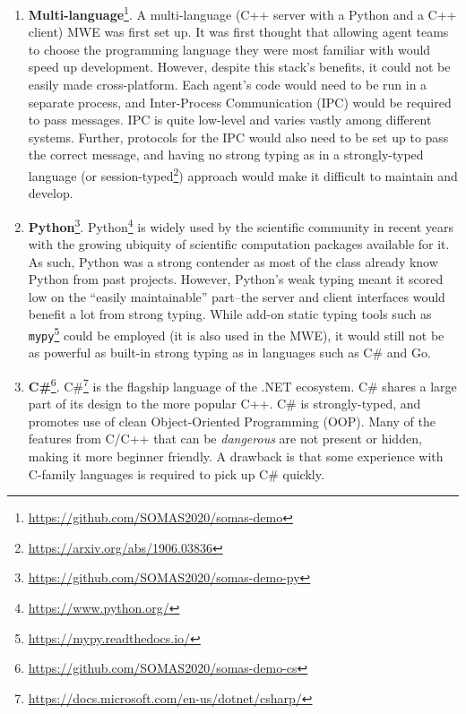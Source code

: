 \begin{enumerate}
    \item \textbf{Multi-language}\footnote{\url{https://github.com/SOMAS2020/somas-demo}}.
          A multi-language (C++ server with a Python and a C++ client) MWE was first set up. It was first thought that allowing agent teams to choose the programming language they were most familiar with would speed up development. However, despite this stack's benefits, it could not be easily made cross-platform. Each agent's code would need to be run in a separate process, and Inter-Process Communication (IPC) would be required to pass messages. IPC is quite low-level and varies vastly among different systems. Further, protocols for the IPC would also need to be set up to pass the correct message, and having no strong typing as in a strongly-typed language (or session-typed\footnote{\url{https://arxiv.org/abs/1906.03836}}) approach would make it difficult to maintain and develop.

    \item \textbf{Python}\footnote{\url{https://github.com/SOMAS2020/somas-demo-py}}.
          Python\footnote{\url{https://www.python.org/}} is widely used by the scientific community in recent years with the growing ubiquity of scientific computation packages available for it. As such, Python was a strong contender as most of the class already know Python from past projects. However, Python's weak typing meant it scored low on the ``easily maintainable'' part--the server and client interfaces would benefit a lot from strong typing. While add-on static typing tools such as \texttt{mypy}\footnote{\url{https://mypy.readthedocs.io/}} could be employed (it is also used in the MWE), it would still not be as powerful as built-in strong typing as in languages such as C\# and Go.

    \item \textbf{C\#}\footnote{\url{https://github.com/SOMAS2020/somas-demo-cs}}.
          C\#\footnote{\url{https://docs.microsoft.com/en-us/dotnet/csharp/}} is the flagship language of the .NET ecosystem. C\# shares a large part of its design to the more popular C++. C\# is strongly-typed, and promotes use of clean Object-Oriented Programming (OOP). Many of the features from C/C++ that can be \emph{dangerous} are not present or hidden, making it more beginner friendly. A drawback is that some experience with C-family languages is required to pick up C\# quickly.


\end{enumerate}
